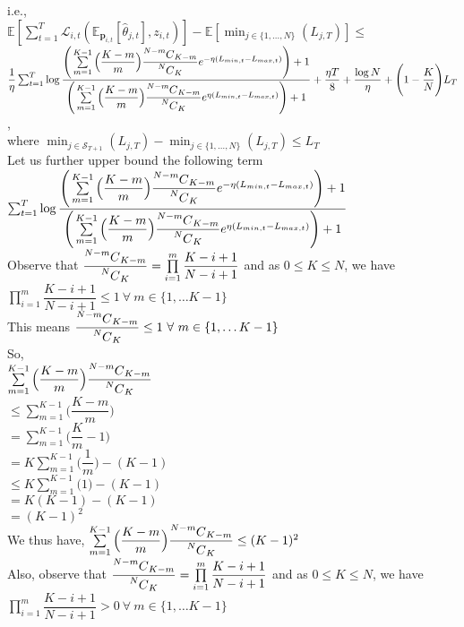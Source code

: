 \documentclass{article}
\newcommand\Mycomb[2][^n]{\prescript{#1\mkern-0.5mu}{}C_{#2}}
\theoremstyle{definition}
\begin{document}
    i.e.,\\
    $\mathbb{E}[\sum_{t=1}^{T}\mathcal{L}_{i,t}(\mathbb{E}_{\bm{p}_{i,t}}[\hat{\theta}_{j,t}],z_{i,t})]-\mathbb{E}[\min_{j\in\{1,\ldots,N\}}(L_{j,T})]\leq$\\
    $\dfrac{1}{\eta}\sum_{t=1}^{T}\log{{\dfrac{\Bigg(\sum\limits_{m=1}^{K-1}\Big(\dfrac{K-m}{m}\Big){\dfrac{\Mycomb[N-m]{K-m}}{\Mycomb[N]{K}}}e^{-\eta(L_{min,t}-L_{max,t})}\Bigg)+1}{\Bigg(\sum\limits_{m=1}^{K-1}\Big(\dfrac{K-m}{m}\Big){\dfrac{\Mycomb[N-m]{K-m}}{\Mycomb[N]{K}}}e^{\eta(L_{min,t}-L_{max,t})}\Bigg)+1}}}+\dfrac{\eta T}{8}+\dfrac{\log{N}}{\eta}+\Bigg(1-\dfrac{K}{N}\Bigg)L_{T}$,\\ where $\min_{j\in\mathcal{S}_{T+1}}(L_{j,T})-\min_{j\in\{1,\ldots,N\}}(L_{j,T})\leq L_{T}$\\
    Let us further upper bound the following term\\
    $\sum_{t=1}^{T}\log{{\dfrac{\Bigg(\sum\limits_{m=1}^{K-1}\Big(\dfrac{K-m}{m}\Big){\dfrac{\Mycomb[N-m]{K-m}}{\Mycomb[N]{K}}}e^{-\eta(L_{min,t}-L_{max,t})}\Bigg)+1}{\Bigg(\sum\limits_{m=1}^{K-1}\Big(\dfrac{K-m}{m}\Big){\dfrac{\Mycomb[N-m]{K-m}}{\Mycomb[N]{K}}}e^{\eta(L_{min,t}-L_{max,t})}\Bigg)+1}}}$\\
    Observe that $\dfrac{\Mycomb[N-m]{K-m}}{\Mycomb[N]{K}}=\prod\limits_{i=1}^{m}\dfrac{K-i+1}{N-i+1}$ and as $0\leq K\leq N$, we have $\prod\limits_{i=1}^{m}\dfrac{K-i+1}{N-i+1}\leq1\ \forall\ m\in\{1,\ldots K-1\}$\\
    This means $\dfrac{\Mycomb[N-m]{K-m}}{\Mycomb[N]{K}}\leq1\ \forall\ m\in\{1,\ldots K-1\}$\\
    So,\\
    $\sum\limits_{m=1}^{K-1}\Big(\dfrac{K-m}{m}\Big){\dfrac{\Mycomb[N-m]{K-m}}{\Mycomb[N]{K}}}$\\
    $\leq\sum\limits_{m=1}^{K-1}\Big(\dfrac{K-m}{m}\Big)$\\
    $=\sum\limits_{m=1}^{K-1}\Big(\dfrac{K}{m}-1\Big)$\\
    $=K\sum\limits_{m=1}^{K-1}\Big(\dfrac{1}{m}\Big)-(K-1)$\\
    $\leq K\sum\limits_{m=1}^{K-1}\Big(1\Big)-(K-1)$\\
    $=K(K-1)-(K-1)$\\
    $=(K-1)^{2}$\\
    We thus have, $\sum\limits_{m=1}^{K-1}\Big(\dfrac{K-m}{m}\Big){\dfrac{\Mycomb[N-m]{K-m}}{\Mycomb[N]{K}}}\leq(K-1)^{2}$\\
    Also, observe that $\dfrac{\Mycomb[N-m]{K-m}}{\Mycomb[N]{K}}=\prod\limits_{i=1}^{m}\dfrac{K-i+1}{N-i+1}$ and as $0\leq K\leq N$, we have $\prod\limits_{i=1}^{m}\dfrac{K-i+1}{N-i+1}>0\ \forall\ m\in\{1,\ldots K-1\}$\\
\end{document}
